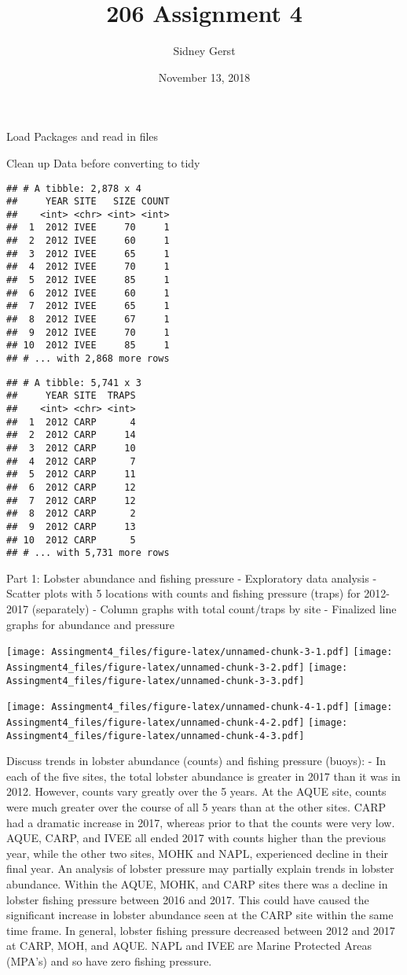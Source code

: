 \documentclass[]{article}
\title{206 Assignment 4}
\author{Sidney Gerst}
\date{November 13, 2018}
\begin{document}
\maketitle

Load Packages and read in files

Clean up Data before converting to tidy

\begin{verbatim}
## # A tibble: 2,878 x 4
##     YEAR SITE   SIZE COUNT
##    <int> <chr> <int> <int>
##  1  2012 IVEE     70     1
##  2  2012 IVEE     60     1
##  3  2012 IVEE     65     1
##  4  2012 IVEE     70     1
##  5  2012 IVEE     85     1
##  6  2012 IVEE     60     1
##  7  2012 IVEE     65     1
##  8  2012 IVEE     67     1
##  9  2012 IVEE     70     1
## 10  2012 IVEE     85     1
## # ... with 2,868 more rows
\end{verbatim}

\begin{verbatim}
## # A tibble: 5,741 x 3
##     YEAR SITE  TRAPS
##    <int> <chr> <int>
##  1  2012 CARP      4
##  2  2012 CARP     14
##  3  2012 CARP     10
##  4  2012 CARP      7
##  5  2012 CARP     11
##  6  2012 CARP     12
##  7  2012 CARP     12
##  8  2012 CARP      2
##  9  2012 CARP     13
## 10  2012 CARP      5
## # ... with 5,731 more rows
\end{verbatim}

Part 1: Lobster abundance and fishing pressure - Exploratory data
analysis - Scatter plots with 5 locations with counts and fishing
pressure (traps) for 2012-2017 (separately) - Column graphs with total
count/traps by site - Finalized line graphs for abundance and pressure

\texttt{[image: Assingment4\_files/figure-latex/unnamed-chunk-3-1.pdf]}
\texttt{[image: Assingment4\_files/figure-latex/unnamed-chunk-3-2.pdf]}
\texttt{[image: Assingment4\_files/figure-latex/unnamed-chunk-3-3.pdf]}

\texttt{[image: Assingment4\_files/figure-latex/unnamed-chunk-4-1.pdf]}
\texttt{[image: Assingment4\_files/figure-latex/unnamed-chunk-4-2.pdf]}
\texttt{[image: Assingment4\_files/figure-latex/unnamed-chunk-4-3.pdf]}

Discuss trends in lobster abundance (counts) and fishing pressure
(buoys): - In each of the five sites, the total lobster abundance is
greater in 2017 than it was in 2012. However, counts vary greatly over
the 5 years. At the AQUE site, counts were much greater over the course
of all 5 years than at the other sites. CARP had a dramatic increase in
2017, whereas prior to that the counts were very low. AQUE, CARP, and
IVEE all ended 2017 with counts higher than the previous year, while the
other two sites, MOHK and NAPL, experienced decline in their final year.
An analysis of lobster pressure may partially explain trends in lobster
abundance. Within the AQUE, MOHK, and CARP sites there was a decline in
lobster fishing pressure between 2016 and 2017. This could have caused
the significant increase in lobster abundance seen at the CARP site
within the same time frame. In general, lobster fishing pressure
decreased between 2012 and 2017 at CARP, MOH, and AQUE. NAPL and IVEE
are Marine Protected Areas (MPA's) and so have zero fishing pressure.
\end{document}
